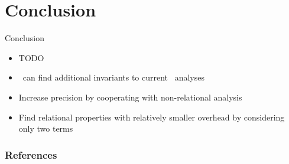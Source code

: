 \documentclass[aspectratio=169]{beamer}
\begin{document}
\section{Conclusion}

\begin{frame}{Conclusion}
    \begin{itemize}
        \item TODO
        \item \cpo\ can find additional invariants to current \goblint\ analyses
        \item Increase precision by cooperating with non-relational analysis
        \item Find relational properties with relatively smaller overhead by considering only two terms
    \end{itemize}
\end{frame}

\appendix

\begin{frame}[allowframebreaks]
    \frametitle{References}
    
    
\end{frame}
\end{document}
